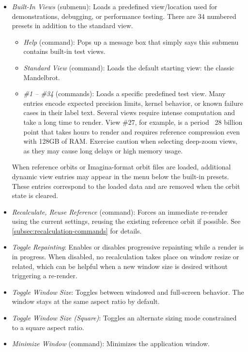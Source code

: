 \begin{itemize}
  \item \emph{Built-In Views} (submenu): Loads a predefined view/location used
  for demonstrations, debugging, or performance testing. There are 34 numbered
  presets in addition to the standard view.
    \begin{itemize}
      \item \emph{Help} (command): Pops up a message box that simply says this
      submenu contains built-in test views.
      \item \emph{Standard View} (command): Loads the default starting view: the
      classic Mandelbrot.
      \item \emph{\#1 -- \#34} (commands): Loads a specific predefined
      test view. Many entries encode expected precision limits, kernel behavior,
      or known failure cases in their label text.  Several views require intense
      computation and take a long time to render.  View \#27, for example, is a
      period ~28 billion point that takes hours to render and requires reference
      compression even with 128GB of RAM.  Exercise caution when selecting deep-zoom
      views, as they may cause long delays or high memory usage.

    \end{itemize}
    When reference orbits or Imagina-format orbit files are loaded, additional
    dynamic view entries may appear in the menu below the built-in presets.
    These entries correspond to the loaded data and are removed when the orbit
    state is cleared.

  \item \emph{Recalculate, Reuse Reference} (command): Forces an immediate
  re-render using the current settings, reusing the existing reference orbit if
  possible.  See \cref{subsec:recalculation-commands} for details.

  \item \emph{Toggle Repainting}: Enables or disables progressive
  repainting while a render is in progress. When disabled, no recalculation
  takes place on window resize or related, which can be helpful when a new
  window size is desired without triggering a re-render.
  \item \emph{Toggle Window Size}: Toggles between windowed and
  full-screen behavior.  The window stays at the same aspect ratio by default.
  \item \emph{Toggle Window Size (Square)}: Toggles an alternate sizing
  mode constrained to a square aspect ratio.
  \item \emph{Minimize Window} (command): Minimizes the application window.


\end{itemize}
